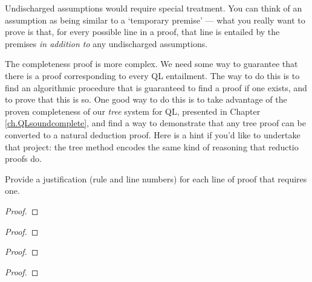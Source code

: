 Undischarged assumptions would require special treatment. You can think of an assumption as being similar to a `temporary premise' --- what you really want to prove is that, for every possible line in a proof, that line is entailed by the premises \emph{in addition to} any undischarged assumptions.

The completeness proof is more complex. We need some way to guarantee that there is a proof corresponding to every QL entailment. The way to do this is to find an algorithmic procedure that is guaranteed to find a proof if one exists, and to prove that this is so. One good way to do this is to take advantage of the proven completeness of our \emph{tree} system for QL, presented in Chapter \ref{ch.QLsoundcomplete}, and find a way to demonstrate that any tree proof can be converted to a natural deduction proof. Here is a hint if you'd like to undertake that project: the tree method encodes the same kind of reasoning that reductio proofs do.

\practiceproblems

\solutions
\problempart
\label{pr.justifyQLproof}
Provide a justification (rule and line numbers) for each line of proof that requires one.
\begin{multicols}{2}
\begin{proof}
	\open
	\close
{} {}
\end{proof}

\begin{proof}
 {}
 {}
\end{proof}


\begin{proof}
\open
\close
{}
\end{proof}


\begin{proof}
	\open
	\close
{} {}
\end{proof}
\end{multicols}

